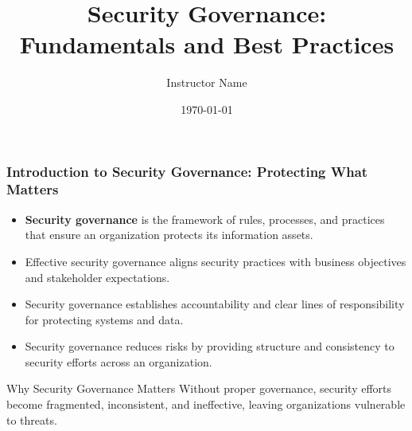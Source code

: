 \documentclass{beamer}
\title{Security Governance: Fundamentals and Best Practices}
\author{Instructor Name}
\institute{School/College Name}
\date{\today}
\begin{document}
\begin{frame}
\titlepage
\end{frame}

\begin{frame}
\frametitle{Introduction to Security Governance: Protecting What Matters}
\begin{itemize}
\item \textbf{Security governance} is the framework of rules, processes, and practices that ensure an organization protects its information assets.
\item Effective security governance aligns security practices with business objectives and stakeholder expectations.
\item Security governance establishes accountability and clear lines of responsibility for protecting systems and data.
\item Security governance reduces risks by providing structure and consistency to security efforts across an organization.
\end{itemize}

\begin{alertblock}{Why Security Governance Matters}
Without proper governance, security efforts become fragmented, inconsistent, and ineffective, leaving organizations vulnerable to threats.
\end{alertblock}
\end{frame}
\end{document}
